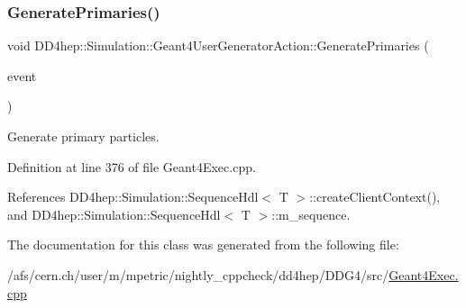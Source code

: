\subsubsection{\texorpdfstring{Generate\+Primaries()}{GeneratePrimaries()}}
{\footnotesize\ttfamily void D\+D4hep\+::\+Simulation\+::\+Geant4\+User\+Generator\+Action\+::\+Generate\+Primaries (\begin{DoxyParamCaption}\item[{G4\+Event $\ast$}]{event }\end{DoxyParamCaption})\hspace{0.3cm}{\ttfamily [virtual]}}



Generate primary particles. 



Definition at line 376 of file Geant4\+Exec.\+cpp.



References D\+D4hep\+::\+Simulation\+::\+Sequence\+Hdl$<$ T $>$\+::create\+Client\+Context(), and D\+D4hep\+::\+Simulation\+::\+Sequence\+Hdl$<$ T $>$\+::m\+\_\+sequence.



The documentation for this class was generated from the following file\+:\begin{DoxyCompactItemize}
\item 
/afs/cern.\+ch/user/m/mpetric/nightly\+\_\+cppcheck/dd4hep/\+D\+D\+G4/src/\hyperlink{_geant4_exec_8cpp}{Geant4\+Exec.\+cpp}\end{DoxyCompactItemize}
